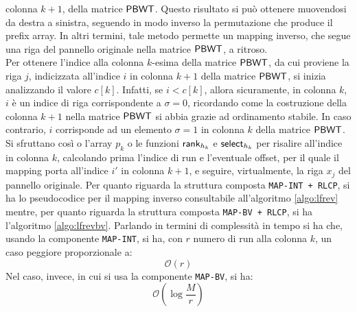 colonna $k+1$, della 
matrice $\mbox{\rm {\sf PBWT}}$. Questo risultato si può ottenere muovendosi da destra a
sinistra, seguendo in modo 
inverso la permutazione che produce il prefix array. In altri termini,
tale metodo permette un mapping inverso, che segue una riga del
pannello originale nella matrice $\mbox{\rm {\sf PBWT}}$, a ritroso.\\ 
Per ottenere l'indice alla colonna $k$-esima della matrice $\mbox{\rm {\sf PBWT}}$, da cui
proviene la riga $j$, indicizzata all'indice $i$ in
colonna $k+1$ della matrice $\mbox{\rm {\sf PBWT}}$, si inizia analizzando il valore
$c[k]$. Infatti, se $i<c[k]$, 
allora sicuramente, in colonna $k$, $i$ è un indice di riga corrispondente a
$\sigma=0$, ricordando come la costruzione della colonna $k+1$
nella matrice $\mbox{\rm {\sf PBWT}}$ si abbia grazie ad ordinamento stabile. In caso contrario,
$i$ corrisponde ad un elemento $\sigma=1$ in colonna $k$ della matrice $\mbox{\rm {\sf PBWT}}$.
Si sfruttano 
così o l'array $p_k$ o le funzioni 
$\mbox{\rm {\sf rank}}_{h_k}$ e $\mbox{\rm {\sf select}}_{h_k}$ per risalire all'indice in colonna $k$,
calcolando 
prima l'indice di run e l'eventuale offset, per il quale il mapping porta
all'indice $i'$ in colonna $k+1$, e seguire, virtualmente, la riga $x_j$ del
pannello originale. 
Per quanto riguarda la struttura composta \texttt{MAP-INT + RLCP}, si ha lo
pseudocodice per il 
mapping inverso consultabile all'algoritmo \ref{algo:lfrev} mentre, per quanto
riguarda la struttura composta \texttt{MAP-BV + RLCP}, si ha l'algoritmo
\ref{algo:lfrevbv}. Parlando in termini di complessità in tempo si ha che,
usando la componente \texttt{MAP-INT}, si ha, con $r$ numero di run alla
colonna $k$, un caso peggiore proporzionale a:
\begin{equation}
  \label{eq:revint}
  \mathcal{O}(r)
\end{equation}
Nel caso, invece, in cui si usa la componente \texttt{MAP-BV}, si ha:
\begin{equation}
  \label{eq:revbv}
  \mathcal{O}\left(\log\frac{M}{r}\right)
\end{equation}
